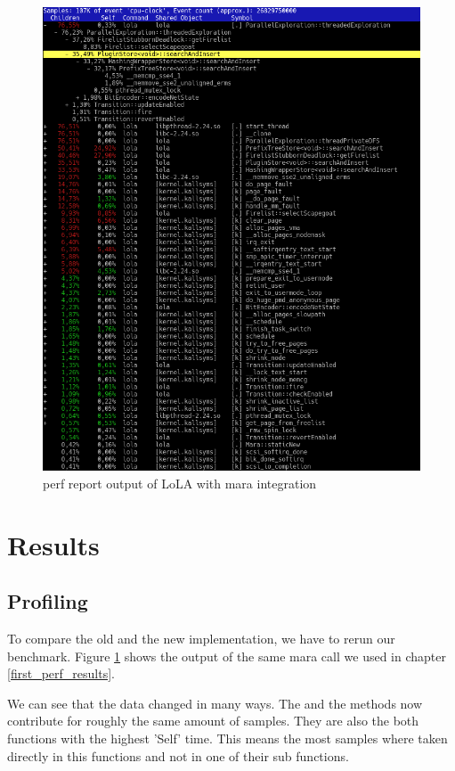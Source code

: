 \begin{figure}
    \centering
    \includegraphics[width=\textwidth]{pictures/perfReportMara.png}
    \caption{perf report output of LoLA with mara integration}
    \label{perf_record_mara}
\end{figure}

\section{Results}
\subsection{Profiling}
To compare the old and the new implementation, we have to rerun our benchmark. Figure \ref{perf_record_mara} shows the output of the same mara call we used in chapter \ref{first_perf_results}.

We can see that the data changed in many ways. The  and the  methods now contribute for roughly the same amount of samples. They are also the both functions with the highest 'Self' time. This means the most samples where taken directly in this functions and not in one of their sub functions.

